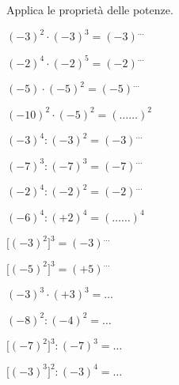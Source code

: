 \begin{esercizio}
\label{ese:2.23}
 Applica le proprietà delle potenze.
 
\vspace{-1em}
\begin{htmulticols}{2}
 \begin{enumeratees}
 \item \((-3)^2\cdot(-3)^3 = (-3)^{\ldots}\)
 \item \((-2)^4\cdot(-2)^5 = (-2)^{\ldots}\)
 \item \((-5)\cdot(-5)^2 = (-5)^{\ldots}\)
 \item \((-10)^2\cdot(-5)^2 = (\ldots \ldots)^2\)
 \item \((-3)^4:(-3)^2 = (-3)^{\ldots}\)
 \item \((-7)^3:(-7)^3=(-7)^{\ldots}\)
 \item \((-2)^4:(-2)^2=(-2)^{\ldots}\)
 \item \((-6)^4:(+2)^4=(\ldots \ldots)^4\)
 \item \(\big[(-3)^2\big]^3 = (-3)^{\ldots}\)
 \item \(\big[(-5)^2\big]^3=(+5)^{\ldots}\)
 \item \((-3)^3\cdot(+3)^3 = \ldots\)
 \item \((-8)^2:(-4)^2= \ldots\)
 \item \(\big[(-7)^2\big]^3: (-7)^3 =\ldots\)
 \item \(\big[(-3)^3\big]^2: (-3)^4=\ldots\)
 \end{enumeratees}
 \end{htmulticols}
\end{esercizio}

